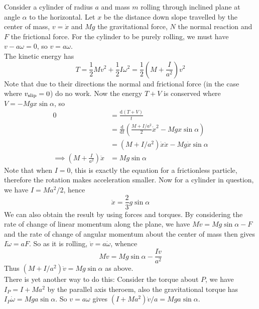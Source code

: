 \begin{example}
    Consider a cylinder of radius $a$ and mass $m$ rolling through inclined plane at angle $\alpha$ to the horizontal.
    Let $x$ be the distance down slope travelled by the center of mass, $v=\dot{x}$ and $Mg$ the gravitational force, $N$ the normal reaction and $F$ the frictional force.
    For the cylinder to be purely rolling, we must have $v-a\omega=0$, so $v=a\omega$.\\
    The kinetic energy has
    $$T=\frac{1}{2}Mv^2+\frac{1}{2}I\omega^2=\frac{1}{2}\left(M+\frac{I}{a^2}\right)v^2$$
    Note that due to their directions the normal and frictional force (in the case where $v_{\rm slip}=0$) do no work.
    Now the energy $T+V$ is conserved where $V=-Mgx\sin\alpha$, so
    \begin{align*}
        0&=\frac{\mathrm d(T+V)}{t}\\
        &=\frac{\mathrm d}{\mathrm dt}\left( \frac{M+I/a^2}{2}\dot{x}^2-Mgx\sin\alpha \right)\\
        &=(M+I/a^2)\dot{x}\ddot{x}-Mg\dot{x}\sin\alpha\\
        \implies \left( M+\frac{I}{a^2} \right)\ddot{x}&=Mg\sin\alpha
    \end{align*}
    Note that when $I=0$, this is exactly the equation for a frictionless particle, therefore the rotation makes acceleration smaller.
    Now for a cylinder in question, we have $I=Ma^2/2$, hence
    $$\ddot{x}=\frac{2}{3}g\sin\alpha$$
    We can also obtain the result by using forces and torques.
    By considering the rate of change of linear momentum along the plane, we have $M\dot{v}=Mg\sin\alpha-F$ and the rate of change of angular momentum about the center of mass then gives $I\dot\omega=aF$.
    So as it is rolling, $\dot{v}=a\dot\omega$, whence
    $$M\dot{v}=Mg\sin\alpha-\frac{I\dot{v}}{a^2}$$
    Thus $(M+I/a^2)\dot{v}=Mg\sin\alpha$ as above.\\
    There is yet another way to do this:
    Consider the torque about $P$, we have $I_P=I+Ma^2$ by the parallel axis theroem, also the gravitational torque has $I_P\dot\omega=Mga\sin\alpha$.
    So $v=a\omega$ gives $(I+Ma^2)\dot{v}/a=Mga\sin\alpha$.
\end{example}
